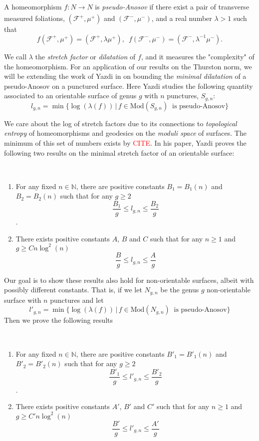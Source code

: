 A homeomorphism $f: N \xrightarrow[]{} N$ is \textit{pseudo-Anosov} if there exist a pair of transverse measured foliations, $(\mathcal{F}^+, \mu^+)$ and $(\mathcal{F}^-, \mu^-)$, and a real number $\lambda > 1$ such that
$$f(\mathcal{F}^+,\mu^+) = (\mathcal{F}^+,\lambda\mu^+), \,\,\, f(\mathcal{F}^-,\mu^-) = (\mathcal{F}^-,\lambda^{-1}\mu^-).$$

We call $\lambda$ the \textit{stretch factor} or \textit{dilatation} of $f$, and it measures the "complexity" of the homeomorphism. For an application of our results on the Thurston norm, we will be extending the work of Yazdi in \cite{yazdi2018pseudo} on bounding the \textit{minimal dilatation} of a pseudo-Anosov on a punctured surface. Here Yazdi studies the following quantity associated to an orientable surface of genus $g$ with $n$ punctures, $S_{g,n}$:
$$l_{g,n} = \min\{\log(\lambda(f)) \, \vert \, f \in \text{Mod}(S_{g,n})\ \text{ is pseudo-Anosov}\}$$

We care about the log of stretch factors due to its connections to \textit{topological entropy} of homeomorphisms and geodesics on the \textit{moduli space} of surfaces. The minimum of this set of numbers exists by \textcolor{red}{CITE}. In his paper, Yazdi proves the following two results on the minimal stretch factor of an orientable surface:
\begin{thm}[Yazdi]
~\begin{enumerate}
    \item For any fixed $n \in \mathbb{N}$, there are positive constants $B_1 = B_1(n)$ and $B_2 = B_2(n)$ such that for any $g \geq 2$ $$\frac{B_1}{g} \leq l_{g,n} \leq \frac{B_2}{g}$$.
    \item There exists positive constants $A$, $B$ and $C$ such that for any $n \geq 1$ and $g \geq Cn\log^2(n)$ $$\frac{B}{g} \leq l_{g,n} \leq \frac{A}{g}$$
\end{enumerate}

\end{thm}

Our goal is to show these results also hold for non-orientable surfaces, albeit with possibly different constants. That is, if we let $N_{g,n}$ be the genus $g$ non-orientable surface with $n$ punctures and let
$$l'_{g,n} = \min\{\log(\lambda(f)) \, \vert \, f \in \text{Mod}(N_{g,n})\ \text{ is pseudo-Anosov}\}$$
Then we prove the following results
\begin{thm}
~\begin{enumerate}
    \item For any fixed $n \in \mathbb{N}$, there are positive constants $B'_1 = B'_1(n)$ and $B'_2 = B'_2(n)$ such that for any $g \geq 2$ $$\frac{B'_1}{g} \leq l'_{g,n} \leq \frac{B'_2}{g}$$.
    \item There exists positive constants $A'$, $B'$ and $C'$ such that for any $n \geq 1$ and $g \geq C'n\log^2(n)$ $$\frac{B'}{g} \leq l'_{g,n} \leq \frac{A'}{g}$$
\end{enumerate}

\end{thm}

